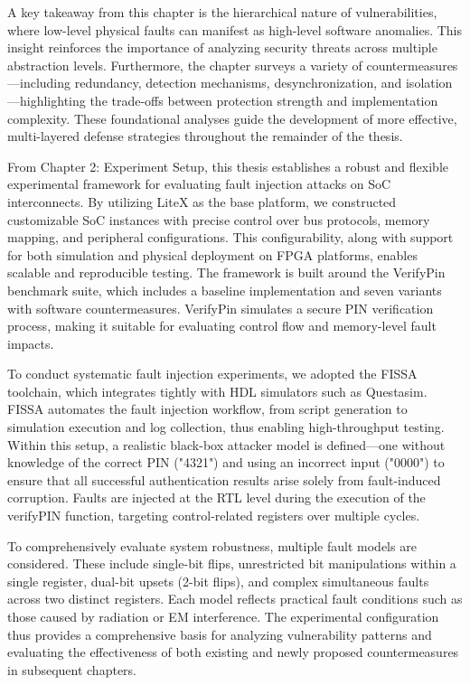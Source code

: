 A key takeaway from this chapter is the hierarchical nature of vulnerabilities, where low-level physical faults can manifest as high-level software anomalies. This insight reinforces the importance of analyzing security threats across multiple abstraction levels. Furthermore, the chapter surveys a variety of countermeasures—including redundancy, detection mechanisms, desynchronization, and isolation—highlighting the trade-offs between protection strength and implementation complexity. These foundational analyses guide the development of more effective, multi-layered defense strategies throughout the remainder of the thesis.

From Chapter 2: Experiment Setup, this thesis establishes a robust and flexible experimental framework for evaluating fault injection attacks on SoC interconnects. By utilizing LiteX as the base platform, we constructed customizable SoC instances with precise control over bus protocols, memory mapping, and peripheral configurations. This configurability, along with support for both simulation and physical deployment on FPGA platforms, enables scalable and reproducible testing. The framework is built around the VerifyPin benchmark suite, which includes a baseline implementation and seven variants with software countermeasures. VerifyPin simulates a secure PIN verification process, making it suitable for evaluating control flow and memory-level fault impacts.

To conduct systematic fault injection experiments, we adopted the FISSA toolchain, which integrates tightly with HDL simulators such as Questasim. FISSA automates the fault injection workflow, from script generation to simulation execution and log collection, thus enabling high-throughput testing. Within this setup, a realistic black-box attacker model is defined—one without knowledge of the correct PIN ("4321") and using an incorrect input ("0000") to ensure that all successful authentication results arise solely from fault-induced corruption. Faults are injected at the RTL level during the execution of the verifyPIN function, targeting control-related registers over multiple cycles.

To comprehensively evaluate system robustness, multiple fault models are considered. These include single-bit flips, unrestricted bit manipulations within a single register, dual-bit upsets (2-bit flips), and complex simultaneous faults across two distinct registers. Each model reflects practical fault conditions such as those caused by radiation or EM interference. The experimental configuration thus provides a comprehensive basis for analyzing vulnerability patterns and evaluating the effectiveness of both existing and newly proposed countermeasures in subsequent chapters.

